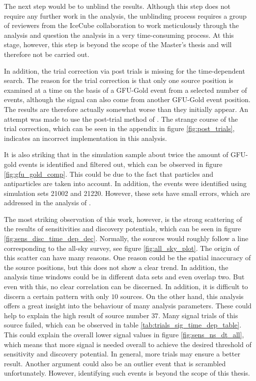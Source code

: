 The next step would be to unblind the results. Although this step does not require any further work in the analysis, the unblinding process requires a group of reviewers from the IceCube collaboration to work meticulously through the analysis and question the analysis in a very time-consuming process. At this stage, however, this step is beyond the scope of the Master's thesis and will therefore not be carried out.

In addition, the trial correction via post trials is missing for the time-dependent search.
The reason for the trial correction is that only one source position is examined at a time on the basis of a GFU-Gold event from a selected number of events, although the signal can also come from another GFU-Gold event position.
The results are therefore actually somewhat worse than they initially appear.
An attempt was made to use the post-trial method of \cite{thorben}.
The strange course of the trial correction, which can be seen in the appendix in figure \ref{fig:post_trials}, indicates an incorrect implementation in this analysis.

It is also striking that in the simulation sample about twice the amount of GFU-gold events is identified and filtered out, which can be observed in figure \ref{fig:gfu_gold_comp}.
This could be due to the fact that particles and antiparticles are taken into account.
In addition, the events were identified using simulation sets 21002 and 21220. However, these sets have small errors, which are addressed in the analysis of \cite{estes}.

The most striking observation of this work, however, is the strong scattering of the results of sensitivities and discovery potentials, which can be seen in figure \ref{fig:sens_disc_time_dep_dec}.
Normally, the sources would roughly follow a line corresponding to the all-sky survey, see figure \ref{fig:all_sky_plot}.
The origin of this scatter can have many reasons. One reason could be the spatial inaccuracy of the source positions, but this does not show a clear trend.
In addition, the analysis time windows could be in different data sets and even overlap two.
But even with this, no clear correlation can be discerned.
In addition, it is difficult to discern a certain pattern with only $\num{10}$ sources.
On the other hand, this analysis offers a great insight into the behaviour of many analysis parameters.
These could help to explain the high result of source number $\num{37}$.
Many signal trials of this source failed, which can be observed in table \ref{tab:trials_sig_time_dep_table}.
This could explain the overall lower signal values in figure \ref{fig:sens_ns_dt_all}, which means that more signal is needed overall to achieve the desired threshold of sensitivity and discovery potential.
In general, more trials may ensure a better result.
Another argument could also be an outlier event that is scrambled unfortunately.
However, identifying such events is beyond the scope of this thesis.


